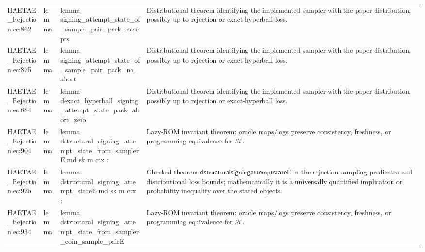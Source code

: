 \documentclass[10pt]{article}
\begin{document}
\begin{longtable}{L{0.11\textwidth}L{0.055\textwidth}L{0.385\textwidth}L{0.41\textwidth}}
HAETAE\_\allowbreak{}Rejection.\allowbreak{}ec:\allowbreak{}862 & lemma & {\ttfamily\scriptsize lemma signing\_\allowbreak{}attempt\_\allowbreak{}state\_\allowbreak{}of\_\allowbreak{}sample\_\allowbreak{}pair\_\allowbreak{}pack\_\allowbreak{}accepts} & Distributional theorem identifying the implemented sampler with the paper distribution, possibly up to rejection or exact-hyperball loss. \\
HAETAE\_\allowbreak{}Rejection.\allowbreak{}ec:\allowbreak{}875 & lemma & {\ttfamily\scriptsize lemma signing\_\allowbreak{}attempt\_\allowbreak{}state\_\allowbreak{}of\_\allowbreak{}sample\_\allowbreak{}pair\_\allowbreak{}pack\_\allowbreak{}no\_\allowbreak{}abort} & Distributional theorem identifying the implemented sampler with the paper distribution, possibly up to rejection or exact-hyperball loss. \\
HAETAE\_\allowbreak{}Rejection.\allowbreak{}ec:\allowbreak{}884 & lemma & {\ttfamily\scriptsize lemma dexact\_\allowbreak{}hyperball\_\allowbreak{}signing\_\allowbreak{}attempt\_\allowbreak{}state\_\allowbreak{}pack\_\allowbreak{}abort\_\allowbreak{}zero} & Distributional theorem identifying the implemented sampler with the paper distribution, possibly up to rejection or exact-hyperball loss. \\
HAETAE\_\allowbreak{}Rejection.\allowbreak{}ec:\allowbreak{}904 & lemma & {\ttfamily\scriptsize lemma dstructural\_\allowbreak{}signing\_\allowbreak{}attempt\_\allowbreak{}state\_\allowbreak{}from\_\allowbreak{}samplerE md sk m ctx :} & Lazy-ROM invariant theorem: oracle maps/logs preserve consistency, freshness, or programming equivalence for $\mathcal H$. \\
HAETAE\_\allowbreak{}Rejection.\allowbreak{}ec:\allowbreak{}925 & lemma & {\ttfamily\scriptsize lemma dstructural\_\allowbreak{}signing\_\allowbreak{}attempt\_\allowbreak{}stateE md sk m ctx :} & Checked theorem $\mathsf{dstructuralsigningattemptstateE}$ in the rejection-sampling predicates and distributional loss bounds; mathematically it is a universally quantified implication or probability inequality over the stated objects. \\
HAETAE\_\allowbreak{}Rejection.\allowbreak{}ec:\allowbreak{}934 & lemma & {\ttfamily\scriptsize lemma dstructural\_\allowbreak{}signing\_\allowbreak{}attempt\_\allowbreak{}state\_\allowbreak{}from\_\allowbreak{}sampler\_\allowbreak{}coin\_\allowbreak{}sample\_\allowbreak{}pairE} & Lazy-ROM invariant theorem: oracle maps/logs preserve consistency, freshness, or programming equivalence for $\mathcal H$. \\

\end{longtable}
\end{document}
